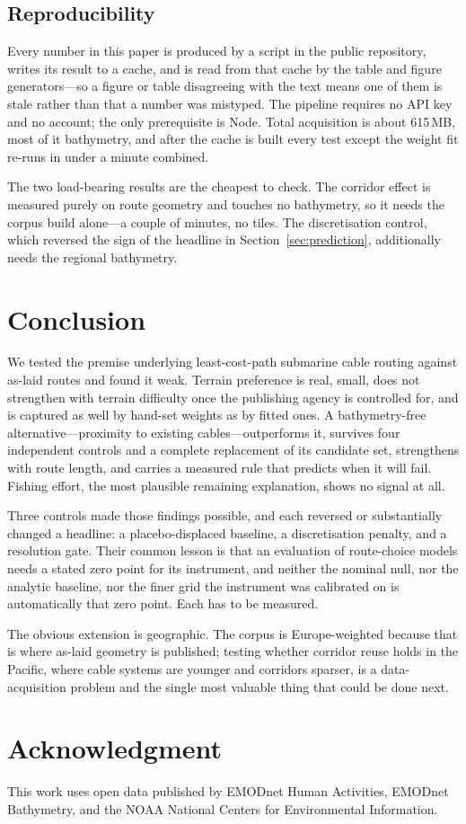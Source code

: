 \documentclass[journal]{IEEEtran}
\begin{document}
\subsection{Reproducibility}\label{sec:repro}
Every number in this paper is produced by a script in the public
repository, writes its result to a cache, and is read from that cache by the
table and figure generators---so a figure or table disagreeing with the text
means one of them is stale rather than that a number was mistyped. The pipeline
requires no API key and no account; the only prerequisite is Node. Total
acquisition is about 615\,MB, most of it bathymetry, and after the cache is
built every test except the weight fit re-runs in under a minute combined.

The two load-bearing results are the cheapest to check. The corridor effect is
measured purely on route geometry and touches no bathymetry, so it needs the
corpus build alone---a couple of minutes, no tiles. The discretisation control,
which reversed the sign of the headline in Section~\ref{sec:prediction},
additionally needs the regional bathymetry.

\section{Conclusion}
We tested the premise underlying least-cost-path submarine cable routing
against \nCorpusRoutes{} as-laid routes and found it weak. Terrain preference
is real, small, does not strengthen with terrain difficulty once the publishing
agency is controlled for, and is captured as well by hand-set weights as by
fitted ones. A bathymetry-free alternative---proximity to existing
cables---outperforms it, survives four independent controls and a complete
replacement of its candidate set, strengthens with route length, and carries a
measured rule that predicts when it will fail. Fishing effort, the most
plausible remaining explanation, shows no signal at all.

Three controls made those findings possible, and each reversed or substantially
changed a headline: a placebo-displaced baseline, a discretisation penalty, and
a resolution gate. Their common lesson is that an evaluation of route-choice
models needs a stated zero point for its instrument, and neither the nominal
null, nor the analytic baseline, nor the finer grid the instrument was
calibrated on is automatically that zero point. Each has to be measured.

The obvious extension is geographic. The corpus is Europe-weighted because that
is where as-laid geometry is published; testing whether corridor reuse holds in
the Pacific, where cable systems are younger and corridors sparser, is a
data-acquisition problem and the single most valuable thing that could be done
next.

\section*{Acknowledgment}
This work uses open data published by EMODnet Human Activities, EMODnet
Bathymetry, and the NOAA National Centers for Environmental Information.



\end{document}
